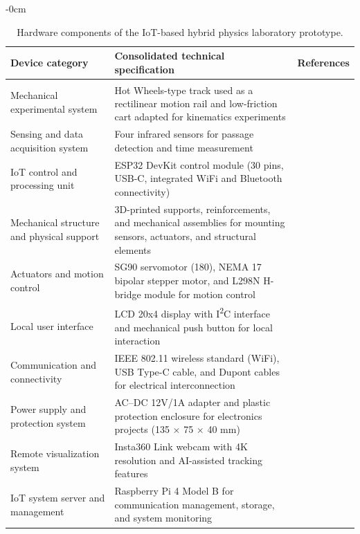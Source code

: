 \documentclass[sensors,article,submit,pdftex]{Definitions/mdpi}
\begin{document}
\begin{table}[H]
	\caption{Hardware components of the IoT-based hybrid physics laboratory prototype.\label{tab:hardware}}
	\small
	\begin{adjustwidth}{-\extralength}{0cm}
		\renewcommand{\arraystretch}{1.5}
		\renewcommand{\tabularxcolumn}[1]{m{#1}}
		\begin{tabularx}{\fulllength}{>{\raggedright\arraybackslash}m{4.5cm}Xc}
			\toprule
			\textbf{Device category} & \textbf{Consolidated technical specification} & \textbf{References} \\
			\midrule
			Mechanical experimental system & Hot Wheels\textsuperscript{\textregistered}-type track used as a rectilinear motion rail and low-friction cart adapted for kinematics experiments & \cite{r18,r19} \\
			Sensing and data acquisition system & Four infrared sensors for passage detection and time measurement & \cite{r20} \\
			IoT control and processing unit & ESP32 DevKit control module (30 pins, USB-C, integrated WiFi and Bluetooth connectivity) & \cite{r21,r53} \\
			Mechanical structure and physical support & 3D-printed supports, reinforcements, and mechanical assemblies for mounting sensors, actuators, and structural elements & \cite{r22,r23,r24,r25} \\
			Actuators and motion control & SG90 servomotor (180\textdegree), NEMA 17 bipolar stepper motor, and L298N H-bridge module for motion control & \cite{r26,r27,r28} \\
			Local user interface & LCD 20x4 display with I\textsuperscript{2}C interface and mechanical push button for local interaction & \cite{r29,r30} \\
			Communication and connectivity & IEEE 802.11 wireless standard (WiFi), USB Type-C cable, and Dupont cables for electrical interconnection & \cite{r31,r32,r33} \\
			Power supply and protection system & AC--DC 12V/1A adapter and plastic protection enclosure for electronics projects (135 $\times$ 75 $\times$ 40 mm) & \cite{r34,r35} \\
			Remote visualization system & Insta360 Link webcam with 4K resolution and AI-assisted tracking features & \cite{r36} \\
			IoT system server and management & Raspberry Pi 4 Model B for communication management, storage, and system monitoring & \cite{r37} \\
			\bottomrule
		\end{tabularx}
	\end{adjustwidth}
\end{table}
\end{document}
